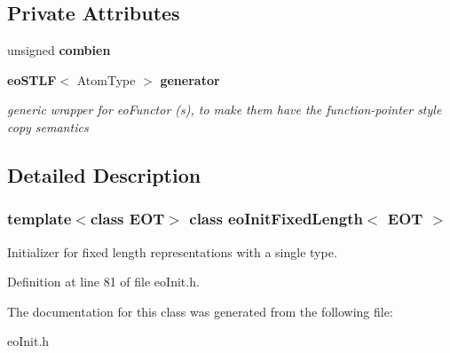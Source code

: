 \subsection*{Private Attributes}
\begin{CompactItemize}
\item 
unsigned {\bf combien}\label{classeo_init_fixed_length_r0}

\item 
{\bf eo\-STLF}$<$ Atom\-Type $>$ {\bf generator}\label{classeo_init_fixed_length_r1}

\begin{CompactList}\small\item\em generic wrapper for eo\-Functor (s), to make them have the function-pointer style copy semantics \item\end{CompactList}\end{CompactItemize}


\subsection{Detailed Description}
\subsubsection*{template$<$class EOT$>$ class eo\-Init\-Fixed\-Length$<$ EOT $>$}

Initializer for fixed length representations with a single type. 



Definition at line 81 of file eo\-Init.h.

The documentation for this class was generated from the following file:\begin{CompactItemize}
\item 
eo\-Init.h\end{CompactItemize}
